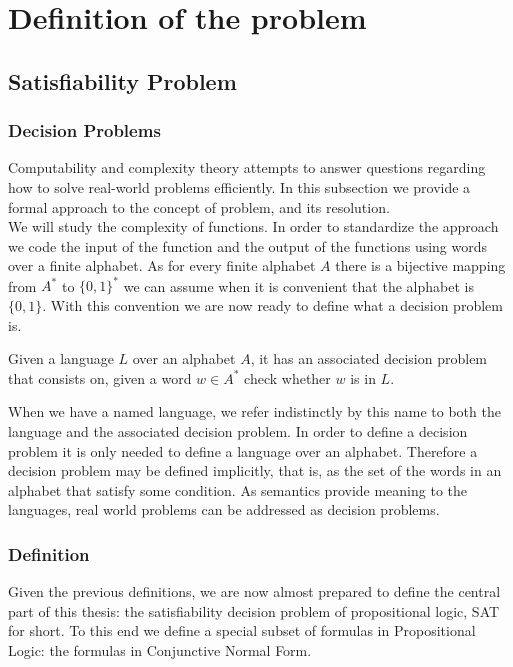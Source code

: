 \chapter{Definition of the problem}
\section{Satisfiability Problem}
\subsection{Decision Problems}
Computability and complexity theory attempts to answer questions regarding how to solve real-world problems efficiently. In this subsection we provide a formal approach to the concept of problem, and its resolution.\\

We will study the complexity of functions. In order to standardize the approach we code the input of the function and the output of the functions using words over a finite alphabet. As for every finite alphabet $A$ there is a bijective mapping from $A^*$ to $\{0,1\}^*$ we can assume when it is convenient that the alphabet is $\{0,1\}$. With this convention we are now ready to define what a decision problem is.

\begin{definition}
  Given a language $L$ over an alphabet $A$, it has an associated decision problem that consists on, given a word $w\in A^*$ check whether $w$ is in $L$. 	
\end{definition}


When we have a named language, we refer indistinctly by this name to both the language and the associated decision problem. In order to define a decision problem it is only needed to define a language over an alphabet. Therefore a decision problem may be defined implicitly, that is, as the set of the words in an alphabet that satisfy some condition. As semantics provide meaning to the languages, real world problems can be addressed as decision problems.


\subsection{Definition}

Given the previous definitions, we are now almost prepared to define the central part of this thesis: the satisfiability decision problem of propositional logic, SAT for short. To this end we define a special subset of formulas in Propositional Logic: the formulas in Conjunctive Normal Form.

